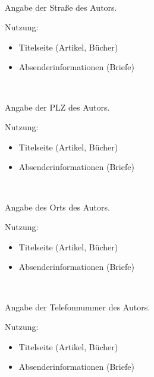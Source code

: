 \begin{nutzung}
		\>\\
	\beispiel
		\>
\end{nutzung}

\DescribeMacro{\strasse}
Angabe der Straße des Autors.

Nutzung:
\begin{itemize}
	\item Titelseite (Artikel, Bücher)
	\item Absenderinformationen (Briefe)
\end{itemize}

\begin{nutzung}
		\>\\
	\beispiel
		\>
\end{nutzung}

\DescribeMacro{\plz}
Angabe der PLZ des Autors.

Nutzung:
\begin{itemize}
	\item Titelseite (Artikel, Bücher)
	\item Absenderinformationen (Briefe)
\end{itemize}

\begin{nutzung}
		\>\\
	\beispiel
		\>
\end{nutzung}

\DescribeMacro{\ort}
Angabe des Orts des Autors.

Nutzung:
\begin{itemize}
	\item Titelseite (Artikel, Bücher)
	\item Absenderinformationen (Briefe)
\end{itemize}

\begin{nutzung}
		\>\\
	\beispiel
		\>
\end{nutzung}

\DescribeMacro{\telefon}
Angabe der Telefonnummer des Autors.

Nutzung:
\begin{itemize}
	\item Titelseite (Artikel, Bücher)
	\item Absenderinformationen (Briefe)
\end{itemize}

